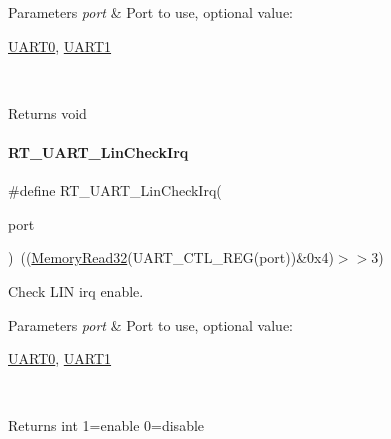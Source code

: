 \begin{DoxyParams}{Parameters}
{\em port} & Port to use, optional value\+:
\begin{DoxyCode}
\mbox{\hyperlink{a00098_a0508661f121639ffdee7de2353a0def2}{UART0}}, \mbox{\hyperlink{a00098_a8d69bf04d07af4fbbab5a8bd291f65ff}{UART1}}
\end{DoxyCode}
 \\
\hline
\end{DoxyParams}
\begin{DoxyReturn}{Returns}
void 
\end{DoxyReturn}
\mbox{\label{a00098_a2e2715198f9716282584f34a7f472649}} 
\paragraph{\texorpdfstring{R\+T\+\_\+\+U\+A\+R\+T\+\_\+\+Lin\+Check\+Irq}{RT\_UART\_LinCheckIrq}}
{\footnotesize\ttfamily \#define R\+T\+\_\+\+U\+A\+R\+T\+\_\+\+Lin\+Check\+Irq(\begin{DoxyParamCaption}\item[{}]{port }\end{DoxyParamCaption})~((\mbox{\hyperlink{a00026_a2d484dc15bdf30ee11ab3b05f31f0e16}{Memory\+Read32}}(U\+A\+R\+T\+\_\+\+C\+T\+L\+\_\+\+R\+EG(port))\&0x4)$>$$>$3)}



Check L\+IN irq enable. 


\begin{DoxyParams}{Parameters}
{\em port} & Port to use, optional value\+:
\begin{DoxyCode}
\mbox{\hyperlink{a00098_a0508661f121639ffdee7de2353a0def2}{UART0}}, \mbox{\hyperlink{a00098_a8d69bf04d07af4fbbab5a8bd291f65ff}{UART1}}
\end{DoxyCode}
 \\
\hline
\end{DoxyParams}
\begin{DoxyReturn}{Returns}
int 1=enable 0=disable 
\end{DoxyReturn}
\mbox{\label{a00098_ad1e6c13693e5ea54a55ce78635617178}} 
